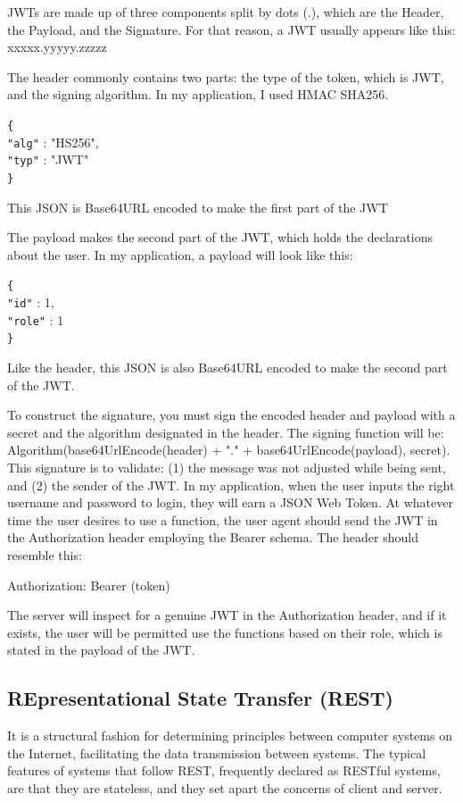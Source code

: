 \documentclass[a4paper, 11pt,openany]{book} %
\begin{document}
JWTs are made up of three components split by dots (.), which are the Header, the Payload, and the Signature. For that reason, a JWT usually appears like this: xxxxx.yyyyy.zzzzz\par

The header commonly contains two parts: the type of the token, which is JWT, and the signing algorithm. In my application, I used HMAC SHA256.
\begin{tabbing}
\verb|{| \\
\quad \verb|"alg"| : "HS256", \\
\quad  \verb|"typ"| : "JWT" \\
\verb|}|
\end{tabbing}
This JSON is Base64URL encoded to make the first part of the JWT\par
The payload makes the second part of the JWT, which holds the declarations about the user.
In my application, a payload will look like this:
\begin{tabbing}
\verb|{| \\
\quad \verb|"id"| : 1, \\
\quad  \verb|"role"| : 1 \\
\verb|}|
\end{tabbing}
Like the header, this JSON is also Base64URL encoded to make the second part of the JWT.\par
To construct the signature, you must sign the encoded header and payload with a secret and the algorithm designated in the header. The signing function will be: Algorithm(base64UrlEncode(header) + "." + base64UrlEncode(payload), secret). This signature is to validate: (1) the message was not adjusted while being sent, and (2) the sender of the JWT.
In my application, when the user inputs the right username and password to login, they will earn a JSON Web Token. At whatever time the user desires to use a function, the user agent should send the JWT in the Authorization header employing the Bearer schema. The header should resemble this:\par
Authorization: Bearer (token)\par
The server will inspect for a genuine JWT in the Authorization header, and if it exists, the user will be permitted use the functions based on their role, which is stated in the payload of the JWT.\cite{jwt}
\subsection{REpresentational State Transfer (REST)}
It is a structural fashion for determining principles between computer systems on the Internet, facilitating the data transmission between systems. The typical features of systems that follow REST, frequently declared as RESTful systems, are that they are stateless, and they set apart the concerns of client and server.
\end{document}
